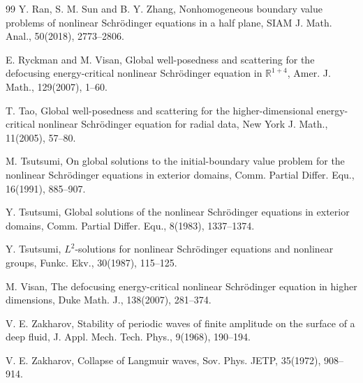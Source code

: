 \documentclass[preprint,compress,12pt]{elsarticle}
\numberwithin{equation}{section}
\begin{document}
\begin{thebibliography}{99}
	Y. Ran, S. M. Sun and B. Y. Zhang, Nonhomogeneous boundary value problems of nonlinear Schr\"{o}dinger equations in a half plane, SIAM J. Math. Anal., 50(2018), 2773--2806.
	
	E. Ryckman and M. Visan, Global well-posedness and scattering for the defocusing energy-critical nonlinear Schr\"{o}dinger equation in $\mathbb{R}^{1+4}$, Amer. J. Math., 129(2007), 1--60.
	
	T. Tao, Global well-posedness and scattering for the higher-dimensional energy-critical nonlinear Schr\"{o}dinger equation for radial data, New York J. Math., 11(2005), 57--80.
	
	M. Tsutsumi, On global solutions to the initial-boundary value problem for the nonlinear Schr\"{o}dinger equations in exterior domains, Comm. Partial Differ. Equ., 16(1991), 885--907.
	
	Y. Tsutsumi, Global solutions of the nonlinear Schr\"{o}dinger equations in exterior domains, Comm. Partial Differ. Equ., 8(1983), 1337--1374.
	
	Y. Tsutsumi, $L^{2}$-solutions for nonlinear Schr\"{o}dinger equations and nonlinear groups, Funkc. Ekv., 30(1987), 115--125.
	
	M. Visan, The defocusing energy-critical nonlinear Schr\"{o}dinger equation in higher dimensions, Duke Math. J., 138(2007), 281--374.
	
	V. E. Zakharov, Stability of periodic waves of finite amplitude on the surface of a deep fluid, J. Appl. Mech. Tech. Phys., 9(1968), 190--194.
	
	V. E. Zakharov, Collapse of Langmuir waves, Sov. Phys. JETP, 35(1972), 908--914.
	
\end{thebibliography}
\end{document}
